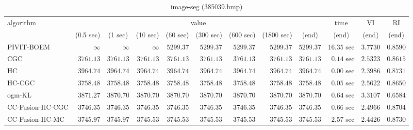 \begin{table}[H]
\scriptsize
\centering
\caption{image-seg (385039.bmp)}
\label{tab:anytimetable-image-seg-385039.bmp}
\begin{tabular}{lrrrrrrrrrrr}
\toprule
           algorithm &                                   \multicolumn{8}{c}{value} & \multicolumn{1}{c}{time}    & \multicolumn{1}{c}{VI}  & \multicolumn{1}{c}{RI} \\  
\cmidrule(lr){2-9}\cmidrule(lr){10-10} \cmidrule(lr){11-11} \cmidrule(lr){12-12}   
                     & \multicolumn{1}{c}{(0.5 sec)} & \multicolumn{1}{c}{(1 sec)} & \multicolumn{1}{c}{(10 sec)} & \multicolumn{1}{c}{(60 sec)} & \multicolumn{1}{c}{(300 sec)} & \multicolumn{1}{c}{(600 sec)} & \multicolumn{1}{c}{(1800 sec)} & \multicolumn{1}{c}{(end)} & \multicolumn{1}{c}{(end)}    & \multicolumn{1}{c}{(end)}   & \multicolumn{1}{c}{(end)}  \\ \midrule 
          PIVIT-BOEM & $\infty$ & $\infty$ & $\infty$ & $      5299.37$ & $      5299.37$ & $      5299.37$ & $      5299.37$ & $      5299.37$ & $        16.35$ sec    & $       3.7730$  & $       0.8590$ \\ 
                 CGC & $      3761.13$ & $      3761.13$ & $      3761.13$ & $      3761.13$ & $      3761.13$ & $      3761.13$ & $      3761.13$ & $      3761.13$ & $         0.14$ sec    & $       2.5323$  & $       0.8615$ \\ 
                  HC & $      3964.74$ & $      3964.74$ & $      3964.74$ & $      3964.74$ & $      3964.74$ & $      3964.74$ & $      3964.74$ & $      3964.74$ & $         0.00$ sec    & $       2.3986$  & $       0.8731$ \\ 
              HC-CGC & $      3758.48$ & $      3758.48$ & $      3758.48$ & $      3758.48$ & $      3758.48$ & $      3758.48$ & $      3758.48$ & $      3758.48$ & $         0.05$ sec    & $       2.5622$  & $       0.8650$ \\ 
              ogm-KL & $      3871.27$ & $      3870.70$ & $      3870.70$ & $      3870.70$ & $      3870.70$ & $      3870.70$ & $      3870.70$ & $      3870.70$ & $         0.64$ sec    & $       3.3107$  & $       0.6584$ \\ 
    CC-Fusion-HC-CGC & $      3746.35$ & $      3746.35$ & $      3746.35$ & $      3746.35$ & $      3746.35$ & $      3746.35$ & $      3746.35$ & $      3746.35$ & $         0.66$ sec    & $       2.4966$  & $       0.8704$ \\ 
     CC-Fusion-HC-MC & $      3745.97$ & $      3745.97$ & $      3745.53$ & $      3745.53$ & $      3745.53$ & $      3745.53$ & $      3745.53$ & $      3745.53$ & $         2.57$ sec    & $       2.4426$  & $       0.8730$ \\ 

\end{tabular}
\end{table}
